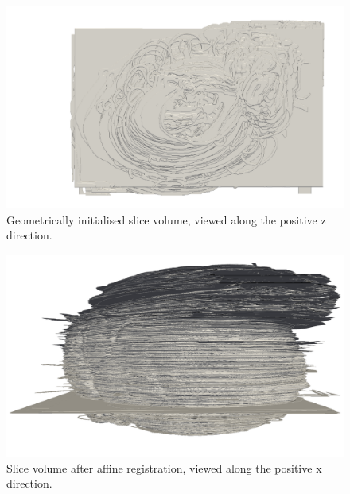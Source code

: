   	\begin{figure}
  	  \centering
  	  \includegraphics[width=0.9\textheight]{Ch6/Figs/Rat28/contours/whole_positive_z_geometric}
  	  \caption{Geometrically initialised slice volume, viewed along the positive z direction.}
  	  \label{fig:positive_z_geometric_contour}
  	\end{figure}

  	\begin{figure}
  	  \centering
  	  \includegraphics[width=0.9\textheight]{Ch6/Figs/Rat28/contours/whole_positive_x_affine}
  	  \caption{Slice volume after affine registration, viewed along the positive x direction.}
  	  \label{fig:positive_x_affine_contour}
  	\end{figure}

